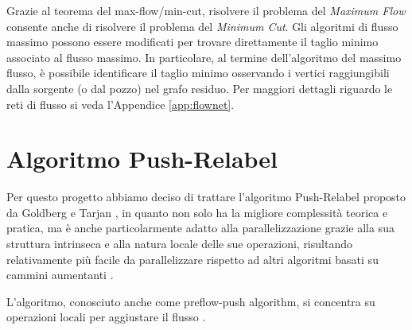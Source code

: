         Grazie al teorema del max-flow/min-cut, risolvere il problema del \textit{Maximum Flow} consente anche di risolvere il problema del \textit{Minimum Cut}. Gli algoritmi di flusso massimo possono essere modificati per trovare direttamente il taglio minimo associato al flusso massimo. In particolare, al termine dell'algoritmo del massimo flusso, è possibile identificare il taglio minimo osservando i vertici raggiungibili dalla sorgente (o dal pozzo) nel grafo residuo. Per maggiori dettagli riguardo le reti di flusso si veda l'Appendice \ref{app:flownet}.
        
    \section{Algoritmo Push-Relabel}


        Per questo progetto abbiamo deciso di trattare l'algoritmo Push-Relabel proposto da Goldberg e Tarjan \cite{PushRelabel}, in quanto non solo ha la migliore complessità teorica e pratica, ma è anche particolarmente adatto alla parallelizzazione grazie alla sua struttura intrinseca e alla natura locale delle sue operazioni, risultando relativamente più facile da parallelizzare rispetto ad altri algoritmi basati su cammini aumentanti \cite{EngineeringWorkload2024, EfficientCUDA2012}.
        
        L'algoritmo, conosciuto anche come preflow-push algorithm, si concentra su operazioni locali per aggiustare il flusso \cite{EngineeringWorkload2024}.


